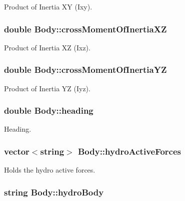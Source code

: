 Product of Inertia X\-Y (Ixy). \hypertarget{class_body_a15c460e8cc8ae20b2420b379c0a6c760}{
\subsubsection[{cross\-Moment\-Of\-Inertia\-X\-Z}]{\setlength{\rightskip}{0pt plus 5cm}double Body\-::cross\-Moment\-Of\-Inertia\-X\-Z}}\label{class_body_a15c460e8cc8ae20b2420b379c0a6c760}
Product of Inertia X\-Z (Ixz). \hypertarget{class_body_a552260d9dc6a203857955df8cc58662a}{
\subsubsection[{cross\-Moment\-Of\-Inertia\-Y\-Z}]{\setlength{\rightskip}{0pt plus 5cm}double Body\-::cross\-Moment\-Of\-Inertia\-Y\-Z}}\label{class_body_a552260d9dc6a203857955df8cc58662a}
Product of Inertia Y\-Z (Iyz). \hypertarget{class_body_afe24a9330df6c053cc4fbbd03d477954}{
\subsubsection[{heading}]{\setlength{\rightskip}{0pt plus 5cm}double Body\-::heading}}\label{class_body_afe24a9330df6c053cc4fbbd03d477954}
Heading. \hypertarget{class_body_af307fb84335ee5e795b44595ce63015c}{
\subsubsection[{hydro\-Active\-Forces}]{\setlength{\rightskip}{0pt plus 5cm}vector$<$string$>$ Body\-::hydro\-Active\-Forces}}\label{class_body_af307fb84335ee5e795b44595ce63015c}
Holds the hydro active forces. \hypertarget{class_body_a843782f1874dd366786864d9d3e0d9b7}{
\subsubsection[{hydro\-Body}]{\setlength{\rightskip}{0pt plus 5cm}string Body\-::hydro\-Body}}\label{class_body_a843782f1874dd366786864d9d3e0d9b7}
